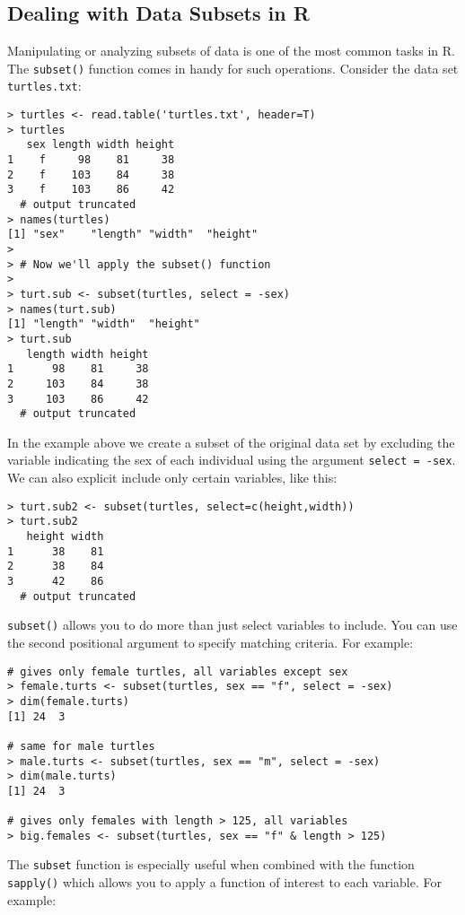 \subsection{Dealing with Data Subsets in R}

Manipulating or analyzing subsets of data is one of the most common
tasks in R. The \lstinline!subset()! function comes in handy for such
operations. Consider the data set \lstinline!turtles.txt!:

\begin{lstlisting}
> turtles <- read.table('turtles.txt', header=T)
> turtles
   sex length width height
1    f     98    81     38
2    f    103    84     38
3    f    103    86     42
  # output truncated
> names(turtles)
[1] "sex"    "length" "width"  "height"
>
> # Now we'll apply the subset() function
>
> turt.sub <- subset(turtles, select = -sex)
> names(turt.sub)
[1] "length" "width"  "height"
> turt.sub
   length width height
1      98    81     38
2     103    84     38
3     103    86     42
  # output truncated
\end{lstlisting}
In the example above we create a subset of the original data set by
excluding the variable indicating the sex of each individual using the
argument \lstinline!select = -sex!. We can also explicit include only
certain variables, like this:

\begin{lstlisting}
> turt.sub2 <- subset(turtles, select=c(height,width))
> turt.sub2
   height width
1      38    81
2      38    84
3      42    86
  # output truncated    
\end{lstlisting}
\lstinline!subset()! allows you to do more than just select variables to
include. You can use the second positional argument to specify matching
criteria. For example:

\begin{lstlisting}
# gives only female turtles, all variables except sex
> female.turts <- subset(turtles, sex == "f", select = -sex)
> dim(female.turts)
[1] 24  3

# same for male turtles
> male.turts <- subset(turtles, sex == "m", select = -sex)
> dim(male.turts)
[1] 24  3

# gives only females with length > 125, all variables
> big.females <- subset(turtles, sex == "f" & length > 125)    
\end{lstlisting}
The \lstinline!subset! function is especially useful when combined with
the function \lstinline!sapply()! which allows you to apply a function
of interest to each variable. For example:

